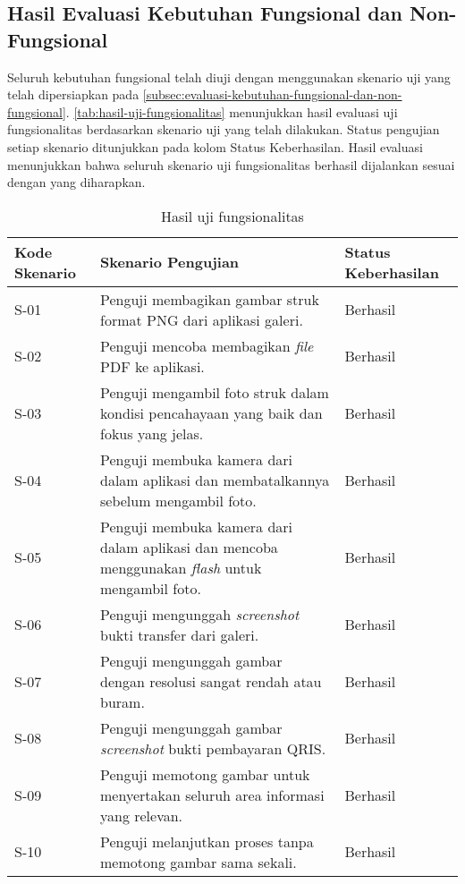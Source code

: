 \subsection{Hasil Evaluasi Kebutuhan Fungsional dan Non-Fungsional}
\label{subsec:hasil-evaluasi-kebutuhan-fungsional-dan-non-fungsional}

Seluruh kebutuhan fungsional telah diuji dengan menggunakan skenario uji yang telah dipersiapkan pada \autoref{subsec:evaluasi-kebutuhan-fungsional-dan-non-fungsional}. \autoref{tab:hasil-uji-fungsionalitas} menunjukkan hasil evaluasi uji fungsionalitas berdasarkan skenario uji yang telah dilakukan. Status pengujian setiap skenario ditunjukkan pada kolom Status Keberhasilan. Hasil evaluasi menunjukkan bahwa seluruh skenario uji fungsionalitas berhasil dijalankan sesuai dengan yang diharapkan.

\begin{table}[h!]
\caption{Hasil uji fungsionalitas}
\label{tab:hasil-uji-fungsionalitas}
\begin{tabularx}{\linewidth}{|p{2cm}|X|p{2.5cm}|}
\hline
\textbf{Kode Skenario} & \textbf{Skenario Pengujian} & \textbf{Status Keberhasilan} \\
\hline
S-01 & Penguji membagikan gambar struk format PNG dari aplikasi galeri. & Berhasil \\
\hline
S-02 & Penguji mencoba membagikan \emph{file} PDF ke aplikasi. & Berhasil \\
\hline
S-03 & Penguji mengambil foto struk dalam kondisi pencahayaan yang baik dan fokus yang jelas. & Berhasil \\
\hline
S-04 & Penguji membuka kamera dari dalam aplikasi dan membatalkannya sebelum mengambil foto. & Berhasil \\
\hline
S-05 & Penguji membuka kamera dari dalam aplikasi dan mencoba menggunakan \emph{flash} untuk mengambil foto. & Berhasil \\
\hline
S-06 & Penguji mengunggah \emph{screenshot} bukti transfer dari galeri. & Berhasil \\
\hline
S-07 & Penguji mengunggah gambar dengan resolusi sangat rendah atau buram. & Berhasil \\
\hline
S-08 & Penguji mengunggah gambar \emph{screenshot} bukti pembayaran QRIS. & Berhasil \\
\hline
S-09 & Penguji memotong gambar untuk menyertakan seluruh area informasi yang relevan. & Berhasil \\
\hline
S-10 & Penguji melanjutkan proses tanpa memotong gambar sama sekali. & Berhasil \\
\hline
\end{tabularx}
\end{table}

